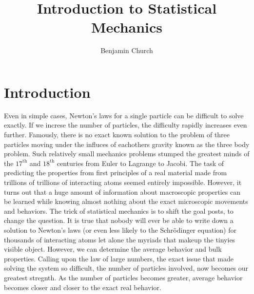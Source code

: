 \documentclass[11pt,a4paper]{article}
\renewcommand{\th}[1]{$#1^\mathrm{th}$}
\theoremstyle{theorem}
\theoremstyle{definition}
\theoremstyle{definition}
\theoremstyle{remark}
\theoremstyle{definition}
\theoremstyle{remark}
\begin{document}
\author{Benjamin Church}
\title{\Huge Introduction to Statistical Mechanics}

\maketitle
\tableofcontents
\newpage


\section{Introduction}
Even in simple cases, Newton's laws for a single particle can be difficult to solve exactly. If we increse the number of particles, the difficulty rapidly increases even further. Famously, there is no exact known solution to the problem of three particles moving under the influces of eachothers gravity known as the three body problem. Such relatively small mechanics problems stumped the greatest minds of the \th{17} and \th{18} centuries from Euler to Lagrange to Jacobi. The task of predicting the properties from first principles of a real material made from trillions of trillions of interacting atoms seemed entirely impossible. However, it turns out that a huge amount of information about macroscopic properties can be learned while knowing almost nothing about the exact microscopic movements and behaviors. The trick of statistical mechanics is to shift the goal posts, to change the question. It is true that nobody will ever be able to write down a solution to Newton's laws (or even less likely to the Schr{\"o}dinger equation) for thousands of interacting atoms let alone the myriads that makeup the tinyies visible object. However, we can determine the average behavior and bulk properties. Calling upon the law of large numbers, the exact issue that made solving the system so difficult, the number of particles involved, now becomes our greatest stregnth. As the number of particles becomes greater, average behavior becomes closer and closer to the exact real behavior.
\end{document}
